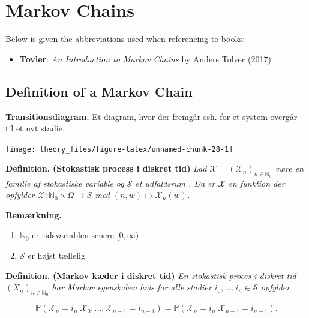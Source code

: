 \documentclass[a4paper,10pt,openany]{book}
\providecommand{\tightlist}{%
 \setlength{\itemsep}{0pt}\setlength{\parskip}{0pt}}
\begin{document}
\hypertarget{markov-chains}{%
\chapter{Markov Chains}\label{markov-chains}}

Below is given the abbreviations used when referencing to books:

\begin{itemize}
\tightlist
\item
  \textbf{Tovler}: \emph{An Introduction to Markov Chains} by Anders Tolver (2017).\cite{tovler2017}
\end{itemize}

\hypertarget{definition-of-a-markov-chain}{%
\section{Definition of a Markov Chain}\label{definition-of-a-markov-chain}}

\textbf{Transitionsdiagram.} Et diagram, hvor der fremgår ssh. for et system overgår til et nyt stadie.

\begin{center}\texttt{[image: theory\_files/figure-latex/unnamed-chunk-28-1]} \end{center}

\textbf{Definition.} \textbf{(Stokastisk process i diskret tid)} \emph{Lad \(\mathcal{X}=(\mathcal{X}_n)_{n\in\mathbb{N}_0}\) være en familie af stokastiske variable og \(\mathcal{S}\) et udfaldsrum . Da er \(\mathcal{X}\) en funktion der opfylder \(\mathcal{X} : \mathbb{N}_0\times \Omega \to \mathcal{S}\) med \((n,w) \mapsto \mathcal{X}_n(w)\).}

\textbf{Bemærkning.}

\begin{enumerate}
\def\labelenumi{\roman{enumi}.}
\tightlist
\item
  \(\mathbb{N}_0\) er tidsvariablen senere \([0,\infty)\)
\item
  \(\mathcal{S}\) er højst tællelig
\end{enumerate}

\textbf{Definition.} \textbf{(Markov kæder i diskret tid)} \emph{En stokastisk proces i diskret tid \((X_n)_{n\in\mathbb{N}_0}\) har \textit{Markov egenskaben} hvis for alle stadier \(i_0,...,i_n\in\mathcal{S}\) opfylder}

\[
\mathbb{P}(\mathcal{X}_n=i_n\vert \mathcal{X}_0,...,\mathcal{X}_{n-1}=i_{n-1})=\mathbb{P}(\mathcal{X}_n=i_n \vert \mathcal{X}_{n-1}=i_{n-1}).
\]
\end{document}
